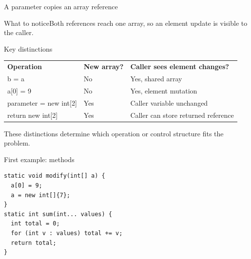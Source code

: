 \documentclass[10pt,aspectratio=169]{beamer}
\begin{document}
\begin{frame}[fragile,t]{A parameter copies an array reference}
\begin{center}\end{center}
\begin{block}{What to notice}Both references reach one array, so an element update is visible to the caller.\end{block}
\end{frame}
\begin{frame}[fragile,t]{Key distinctions}
\small\renewcommand{\arraystretch}{1.5}
\begin{tabularx}{\textwidth}{>{\raggedright\arraybackslash}X>{\raggedright\arraybackslash}X>{\raggedright\arraybackslash}X}
\rowcolor{navy}
\color{white}\bfseries Operation & \color{white}\bfseries New array? & \color{white}\bfseries Caller sees element changes?\\
b = a & No & Yes, shared array\\
a[0] = 9 & No & Yes, element mutation\\
parameter = new int[2] & Yes & Caller variable unchanged\\
return new int[2] & Yes & Caller can store returned reference\\
\end{tabularx}
\vspace{3mm}\footnotesize These distinctions determine which operation or control structure fits the problem.
\end{frame}

\begin{frame}[fragile,t]{First example: methods}
\begin{lstlisting}
static void modify(int[] a) {
  a[0] = 9;
  a = new int[]{7};
}
static int sum(int... values) {
  int total = 0;
  for (int v : values) total += v;
  return total;
}
\end{lstlisting}
\end{frame}
\end{document}
